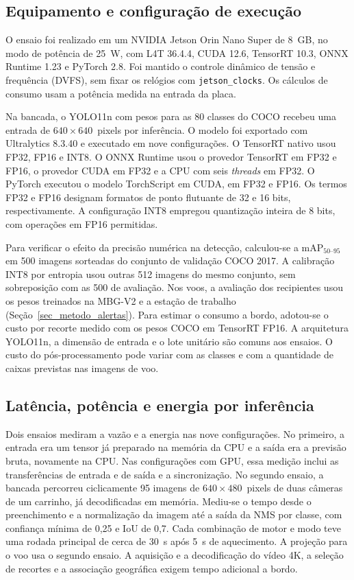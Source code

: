 \subsection{Equipamento e configuração de execução}

O ensaio foi realizado em um NVIDIA Jetson Orin Nano Super de 8~GB, no modo de potência de 25~W, com L4T 36.4.4, CUDA 12.6, TensorRT 10.3, ONNX Runtime 1.23 e PyTorch 2.8. Foi mantido o controle dinâmico de tensão e frequência (DVFS), sem fixar os relógios com \texttt{jetson\_clocks}. Os cálculos de consumo usam a potência medida na entrada da placa.

Na bancada, o YOLO11n com pesos para as 80 classes do COCO recebeu uma entrada de $640\times640$~pixels por inferência. O modelo foi exportado com Ultralytics 8.3.40 e executado em nove configurações. O TensorRT nativo usou FP32, FP16 e INT8. O ONNX Runtime usou o provedor TensorRT em FP32 e FP16, o provedor CUDA em FP32 e a CPU com seis \textit{threads} em FP32. O PyTorch executou o modelo TorchScript em CUDA, em FP32 e FP16. Os termos FP32 e FP16 designam formatos de ponto flutuante de 32 e 16 bits, respectivamente. A configuração INT8 empregou quantização inteira de 8 bits, com operações em FP16 permitidas.

Para verificar o efeito da precisão numérica na detecção, calculou-se a mAP$_{50\text{--}95}$ em 500 imagens sorteadas do conjunto de validação COCO 2017. A calibração INT8 por entropia usou outras 512 imagens do mesmo conjunto, sem sobreposição com as 500 de avaliação. Nos voos, a avaliação dos recipientes usou os pesos treinados na MBG-V2 e a estação de trabalho (Seção~\ref{sec_metodo_alertas}). Para estimar o consumo a bordo, adotou-se o custo por recorte medido com os pesos COCO em TensorRT FP16. A arquitetura YOLO11n, a dimensão de entrada e o lote unitário são comuns aos ensaios. O custo do pós-processamento pode variar com as classes e com a quantidade de caixas previstas nas imagens de voo.

\subsection{Latência, potência e energia por inferência}

Dois ensaios mediram a vazão e a energia nas nove configurações. No primeiro, a entrada era um tensor já preparado na memória da CPU e a saída era a previsão bruta, novamente na CPU. Nas configurações com GPU, essa medição inclui as transferências de entrada e de saída e a sincronização. No segundo ensaio, a bancada percorreu ciclicamente 95 imagens de $640\times480$~pixels de duas câmeras de um carrinho, já decodificadas em memória. Mediu-se o tempo desde o preenchimento e a normalização da imagem até a saída da NMS por classe, com confiança mínima de 0,25 e IoU de 0,7. Cada combinação de motor e modo teve uma rodada principal de cerca de 30~s após 5~s de aquecimento. A projeção para o voo usa o segundo ensaio. A aquisição e a decodificação do vídeo 4K, a seleção de recortes e a associação geográfica exigem tempo adicional a bordo.

